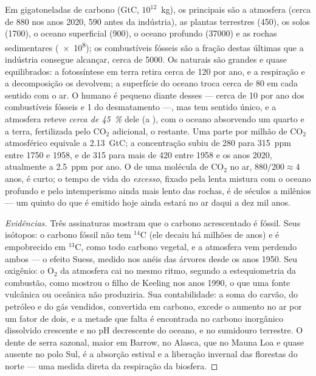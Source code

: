 \begin{proposition}\label{prop:b2:biogeochemical-cycles:carbon}
Em gigatoneladas de carbono (\unit{GtC}, $10^{12}$~kg), os principais
 são a atmosfera (cerca de 880 nos anos 2020, 590 antes da
indústria), as plantas terrestres (450), os solos (1700), o oceano
superficial (900), o oceano profundo (\num{37000}) e as rochas
sedimentares (\num{e8}); os combustíveis fósseis são a fração destas
últimas que a indústria consegue alcançar, cerca de \num{5000}. Os
 naturais são grandes e quase equilibrados: a fotossíntese em
terra retira cerca de 120 por ano, e a respiração e a decomposição os
devolvem; a superfície do oceano troca cerca de 80 em cada sentido com o
ar. O  humano é pequeno diante desses --- cerca de 10 por ano dos
combustíveis fósseis e 1 do desmatamento ---, mas tem sentido único, e a
atmosfera reteve \emph{cerca de \qty{45}{\%}} dele (a \emph{}), com o oceano absorvendo um quarto e a terra, fertilizada
pelo $\mathrm{CO_2}$ adicional, o restante. Uma parte por milhão de $\mathrm{CO_2}$ atmosférico
equivale a \qty{2.13}{GtC}; a concentração subiu de 280 para \num{315}~ppm
entre 1750 e 1958, e de 315 para mais de \num{420} entre 1958 e os anos
2020, atualmente a \qty{2.5}{ppm} por ano. O  de uma
molécula de $\mathrm{CO_2}$ no ar, $880/200 \approx 4$ anos,
é curto; o tempo de vida do \emph{excesso}, fixado pela lenta mistura
com o oceano profundo e pelo intemperismo ainda mais lento das rochas, é
de séculos a milênios --- um quinto do que é emitido hoje ainda estará
no ar daqui a dez mil anos.
\end{proposition}
\begin{proof}[Evidências]
Três assinaturas mostram que o carbono acrescentado é fóssil. Seus
isótopos: o carbono fóssil não tem $\mathrm{{}^{14}C}$ (ele decaiu há
milhões de anos) e é empobrecido em $\mathrm{{}^{13}C}$, como todo carbono
vegetal, e a atmosfera vem perdendo ambos --- o efeito Suess, medido
nos anéis das árvores desde os anos 1950. Seu oxigênio: o
$\mathrm{O_2}$ da atmosfera cai no mesmo ritmo, segundo a estequiometria da
combustão, como mostrou o filho de Keeling nos anos 1990, o que uma fonte
vulcânica ou oceânica não produziria. Sua contabilidade: a soma do
carvão, do petróleo e do gás vendidos, convertida em carbono, excede o
aumento no ar por um fator de dois, e a metade que falta é encontrada no
carbono inorgânico dissolvido crescente e no pH decrescente do oceano, e
no sumidouro terrestre. O dente de serra sazonal, maior em Barrow, no
Alasca, que no Mauna Loa e quase ausente no polo Sul, é a absorção
estival e a liberação invernal das florestas do norte --- uma medida
direta da respiração da biosfera.
\end{proof}

